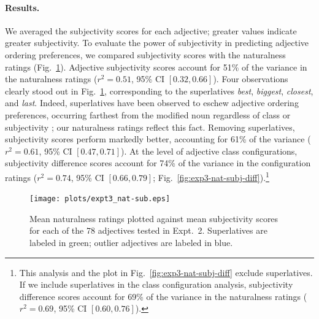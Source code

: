 \documentclass[manuscript]{stjour}
\begin{document}
\paragraph{Results.}



We averaged the subjectivity scores for each adjective; greater values indicate greater subjectivity.
To evaluate the power of subjectivity in predicting adjective ordering preferences, we compared subjectivity scores with the naturalness ratings (Fig.~\ref{fig:exp3-nat-subj}). Adjective subjectivity scores account for 51\% of the variance in the naturalness ratings ($r^2=0.51$, 95\% CI $[0.32, 0.66]$). Four observations clearly stood out in Fig.~\ref{fig:exp3-nat-subj}, corresponding to the superlatives \emph{best}, \emph{biggest}, \emph{closest}, and \emph{last}. Indeed, superlatives have been observed to eschew adjective ordering preferences, occurring farthest from the modified noun regardless of class or subjectivity \citep{dixon1982}; our naturalness ratings reflect this fact. Removing superlatives, subjectivity scores perform markedly better, accounting for 61\% of the variance ($r^2=0.61$, 95\% CI $[0.47, 0.71]$). At the level of adjective class configurations, subjectivity difference scores account for 74\% of the variance in the configuration ratings ($r^2=0.74$, 95\% CI $[0.66, 0.79]$; Fig.~\ref{fig:exp3-nat-subj-diff}).\footnote{This analysis and the plot in Fig.~\ref{fig:exp3-nat-subj-diff} exclude superlatives. If we include superlatives in the class configuration analysis, subjectivity difference scores account for 69\% of the variance in the naturalness ratings ($r^2=0.69$, 95\% CI $[0.60,  0.76]$).}

\begin{figure}
	\centering\texttt{[image: plots/expt3\_nat-sub.eps]}
	\caption{Mean naturalness ratings plotted against mean subjectivity scores for each of the 78 adjectives tested in Expt.~2. Superlatives are labeled in green; outlier adjectives are labeled in blue. 
		}\label{fig:exp3-nat-subj}
\end{figure}
\end{document}
